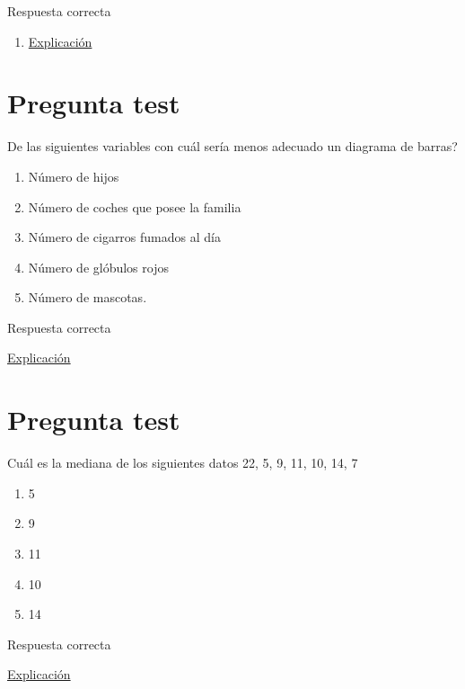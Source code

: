 \documentclass[
]{book}
\providecommand{\tightlist}{%
  \setlength{\itemsep}{0pt}\setlength{\parskip}{0pt}}
\begin{document}
Respuesta correcta

\begin{enumerate}
\def\labelenumi{\alph{enumi})}
\setcounter{enumi}{2}
\tightlist
\item
  \href{https://1fjmanzano.github.io/bioestadistica/tipos-de-variables.html}{Explicación}
\end{enumerate}

\hypertarget{pregunta-test-76}{%
\section{Pregunta test}\label{pregunta-test-76}}

De las siguientes variables con cuál sería menos adecuado un diagrama de barras?

\begin{enumerate}
\def\labelenumi{\alph{enumi})}
\tightlist
\item
  Número de hijos
\item
  Número de coches que posee la familia
\item
  Número de cigarros fumados al día
\item
  Número de glóbulos rojos
\item
  Número de mascotas.
\end{enumerate}

Respuesta correcta

\href{https://1fjmanzano.github.io/bioestadistica/representaciones-gra\%CC\%81ficas.html}{Explicación}

\hypertarget{pregunta-test-77}{%
\section{Pregunta test}\label{pregunta-test-77}}

Cuál es la mediana de los siguientes datos 22, 5, 9, 11, 10, 14, 7

\begin{enumerate}
\def\labelenumi{\alph{enumi})}
\tightlist
\item
  5
\item
  9
\item
  11
\item
  10
\item
  14
\end{enumerate}

Respuesta correcta

\href{https://1fjmanzano.github.io/bioestadistica/medidas-de-posicio\%CC\%81n-dispersio\%CC\%81n-y-forma.html\#medidas-de-posicio\%CC\%81n-centrales}{Explicación}
\end{document}
